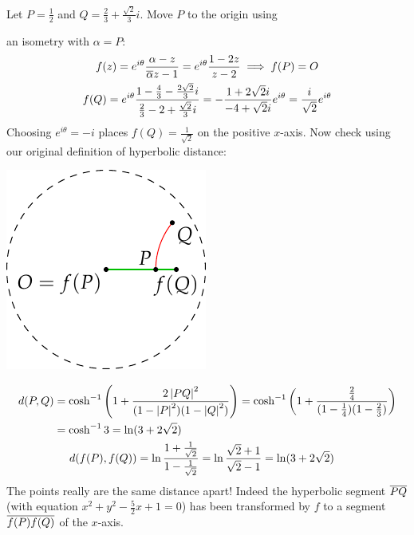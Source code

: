 \begin{example}{}{}
Let $P=\frac 12$ and $Q=\frac 23+\frac{\sqrt 2}3i$. Move $P$ to the origin using\par
\begin{minipage}[t]{0.74\linewidth}\vspace{-8pt}
an isometry with $\alpha=P$:
\begin{gather*}
f(z)=e^{i\theta}\frac{\alpha-z}{\overline{\alpha} z-1}=e^{i\theta}\frac{1-2z}{z-2} \implies f(P)=O\\
f(Q)=e^{i\theta}\frac{1-\frac 43-\frac{2\sqrt 2}3i}{\frac 23-2+\frac{\sqrt 2}3i} =-\frac{1+2\sqrt 2i}{-4+\sqrt 2i}e^{i\theta} =\frac{i}{\sqrt 2}e^{i\theta}
\end{gather*}
Choosing $e^{i\theta}=-i$ places $f(Q)=\frac 1{\sqrt 2}$ on the positive $x$-axis. Now check using our original definition of hyperbolic distance:
\end{minipage}\hfill
\begin{minipage}[t]{0.25\linewidth}\vspace{-20pt}
\flushright\includegraphics{calc-triangle2}
\end{minipage}\par\vspace{-4pt}
\begin{gather*}
\begin{aligned}
d(P,Q)&=\cosh^{-1}\left(1+\frac{2\left| PQ\right|^2}{(1-\left| P\right|^2)(1-\left| Q\right|^2)}\right) =\cosh^{-1}\left(1+\frac{\frac 24}{(1-\frac 14)(1-\frac 23)}\right)\\
&=\cosh^{-1}3=\ln(3+2\sqrt 2)
\end{aligned}\\
\begin{aligned}
d(f(P),f(Q))&=\ln\frac{1+\frac 1{\sqrt 2}}{1-\frac 1{\sqrt 2}}=\ln\frac{\sqrt 2+1}{\sqrt 2-1}=\ln(3+2\sqrt 2)
\end{aligned}
\end{gather*}
The points really are the same distance apart! Indeed the hyperbolic segment \textcolor{red}{$\overline{PQ}$} (with equation $x^2+y^2-\frac 52x+1=0$) has been transformed by $f$ to a segment \textcolor{Green}{$\overline{f(P)f(Q)}$} of the $x$-axis.
\end{example}


